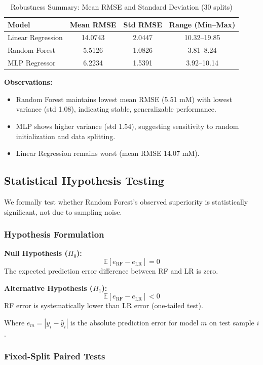 \documentclass[conference]{IEEEtran}
\begin{document}
\begin{table}[htbp]
\caption{Robustness Summary: Mean RMSE and Standard Deviation (30 splits)}
\centering
\begin{tabular}{lccc}
\toprule
Model & Mean RMSE & Std RMSE & Range (Min–Max) \\
\midrule
Linear Regression & 14.0743 & 2.0447 & 10.32–19.85 \\
Random Forest & 5.5126 & 1.0826 & 3.81–8.24 \\
MLP Regressor & 6.2234 & 1.5391 & 3.92–10.14 \\
\bottomrule
\end{tabular}
\end{table}

\textbf{Observations:}
\begin{itemize}
\item Random Forest maintains lowest mean RMSE (5.51 mM) with lowest variance (std 1.08), indicating stable, generalizable performance.
\item MLP shows higher variance (std 1.54), suggesting sensitivity to random initialization and data splitting.
\item Linear Regression remains worst (mean RMSE 14.07 mM).
\end{itemize}

\subsection{Statistical Hypothesis Testing}

We formally test whether Random Forest's observed superiority is statistically significant, not due to sampling noise.

\subsubsection{Hypothesis Formulation}

\textbf{Null Hypothesis ($H_0$):}
\[
\mathbb{E}[e_{\text{RF}} - e_{\text{LR}}] = 0
\]
The expected prediction error difference between RF and LR is zero.

\textbf{Alternative Hypothesis ($H_1$):}
\[
\mathbb{E}[e_{\text{RF}} - e_{\text{LR}}] < 0
\]
RF error is systematically lower than LR error (one-tailed test).

Where $e_m = |y_i - \hat{y}_i|$ is the absolute prediction error for model $m$ on test sample $i$.

\subsubsection{Fixed-Split Paired Tests}
\end{document}
